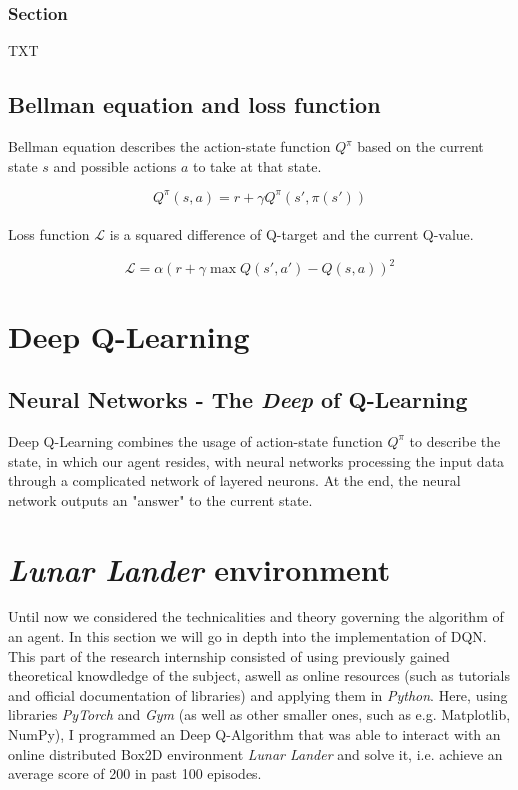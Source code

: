 \documentclass{article}
\begin{document}
\subsubsection{Section}
TXT

\subsection{Bellman equation and loss function}
Bellman equation describes the action-state function $Q^\pi$ based on the current state $s$ and possible actions $a$ to take at that state.

\begin{equation}
\label{eqn:bellman}
Q^\pi(s,a) = r+\gamma Q^\pi(s',\pi(s'))
\end{equation}
\\
Loss function $\mathcal{L}$ is a squared difference of Q-target and the current Q-value.

\begin{equation}
\label{eqn:loss}
\mathcal{L} = \alpha(r+\gamma\max Q(s',a')-Q(s,a))^2
\end{equation}

\section{Deep Q-Learning}
\subsection{Neural Networks - The \textit{Deep} of Q-Learning}
Deep Q-Learning combines the usage of action-state function $Q^\pi$ to describe the state, in which our agent resides, with neural networks processing the input data through a complicated network of layered neurons. At the end, the neural network outputs an "answer" to the current state.

\section{\textit{Lunar Lander} environment}
Until now we considered the technicalities and theory governing the algorithm of an agent. In this section we will go in depth into the implementation of DQN. This part of the research internship consisted of using previously gained theoretical knowdledge of the subject, aswell as online resources (such as tutorials and official documentation of libraries) and applying them in \textit{Python}. Here, using libraries \textit{PyTorch} and \textit{Gym} (as well as other smaller ones, such as e.g. Matplotlib, NumPy), I programmed an Deep Q-Algorithm that was able to interact with an online distributed Box2D environment  \textit{Lunar Lander} and solve it, i.e. achieve an average score of 200 in past 100 episodes.
\end{document}
